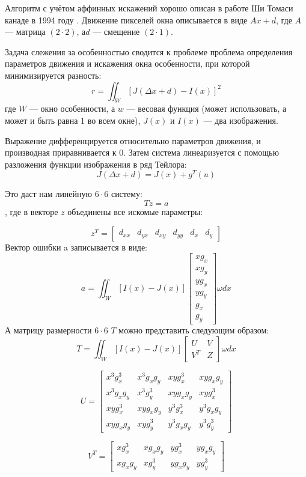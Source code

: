 Алгоритм с учётом аффинных искажений хорошо описан в работе Ши Томаси канаде в 1994 году \cite{shi_tom_lyk}. Движение пикселей окна описывается в виде $Ax + d$, где $A$ — матрица $(2 \cdot 2)$, $а d$ — смещение $(2 \cdot 1)$.

Задача слежения за особенностью сводится к проблеме проблема определения параметров движения и искажения окна особенности, при которой минимизируется разность:
$$r=\iint_W [J(\Delta x+d)-I(x)]^2$$
где $W$ — окно особенности, а $w$ — весовая функция (может использовать, а может и быть равна 1 во всем окне), $J(x)$ и $I(x)$ — два изображения.

Выражение дифференцируется относительно параметров движения, и производная приравнивается к 0. Затем система линеаризуется с помощью разложения функции изображения в ряд Тейлора:
$$J(\Delta x+d)= J(x)+g^T(u)$$

Это даст нам линейную $6 \cdot 6$ систему:
$$Tz=a$$
, где в векторе $z$ объединены все искомые параметры:

$$z^T=\begin{bmatrix}
 d_{xx} & d_{yx} & d_{xy} & d_{yy} & d_x & d_y
\end{bmatrix}$$
Вектор ошибки a записывается в виде:
$$a=\iint_W [I(x)-J(x)]\begin{bmatrix}
xg_x\\
xg_y\\
yg_x\\
yg_y\\
g_x\\
g_y
\end{bmatrix}\omega dx$$
А матрицу размерности $6 \cdot 6$ $T$ можно представить следующим образом:
$$T=\iint_W [I(x)-J(x)]\begin{bmatrix}
U & V\\
V^T & Z
\end{bmatrix}\omega dx$$

$$U=\begin{bmatrix}
x^3 g^3_x & x^3 g_x g_y & x y g^3_x & x y g_x g_y \\
x^3g_xg_y & x^3g^3_y & xyg_xg_y & xyg^3_x \\
xyg^3_x & xyg_xg_y & y^3g^3_x & y^3g_xg_y \\
xyg_xg_y & xyg^3_y & y^3g_xg_y & y^3g^3_y
\end{bmatrix}$$

$$V^T=\begin{bmatrix}
xg^3_x & xg_xg_y & yg^3_x & yg_xg_y \\
xg_xg_y & xg^3_y & yg_xg_y & yg^3_y
\end{bmatrix}$$

